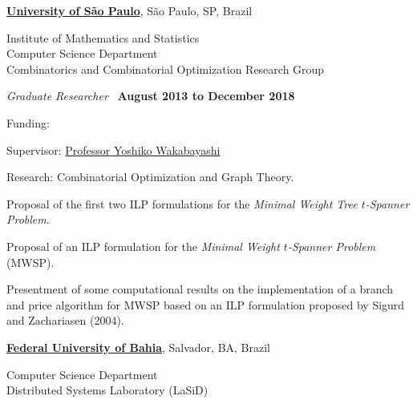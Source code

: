 \documentclass[10pt]{article}
\let\oldcite=\cite
\renewcommand{\cite}[1]{\footnotesize{\textbf{\oldcite{#1}}}\normalsize{}}
\newcommand{\halfblankline}{\quad\vspace{-0.5\baselineskip}\pagebreak[3]}
\begin{document}
\href{http://www.usp.br}{\textbf{University of S\~{a}o Paulo}},
S\~{a}o Paulo, SP, Brazil
\begin{innerlist}
  \item[] 
    Institute of Mathematics and Statistics\\
    Computer Science Department\\
    Combinatorics and Combinatorial Optimization Research Group
\end{innerlist}

\begin{outerlist}

\item[] \textit{Graduate Researcher}~\cite{Braga2017,Braga2018}%
  \hfill \textbf{August 2013 to December 2018}
  \begin{innerlist}
    
  \item Funding:~\cite{Grant2014}
  \item Supervisor: \href{http://www.ime.usp.br/~yw}%
    {Professor Yoshiko Wakabayashi}
  \item Research: Combinatorial Optimization and Graph Theory.
  \item Proposal of the first two ILP formulations for the \emph{Minimal Weight Tree $t$-Spanner Problem}.
  \item Proposal of an ILP formulation for the \emph{Minimal Weight $t$-Spanner Problem} (MWSP).
  \item Presentment of some computational results on the implementation of a branch and price algorithm for MWSP based on an ILP formulation proposed by Sigurd and Zachariasen (2004).  

  \end{innerlist}

\end{outerlist}

\halfblankline

\href{http://www.ufba.br}{\textbf{Federal University of Bahia}},
Salvador, BA, Brazil

\begin{innerlist}
  \item[]
    Computer Science Department\\
    Distributed Systems Laboratory (LaSiD)
\end{innerlist}
\end{document}
